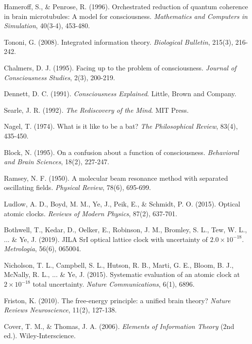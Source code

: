 \documentclass[12pt,a4paper]{article}
\begin{document}
\begin{thebibliography}{99}
Hameroff, S., \& Penrose, R. (1996). Orchestrated reduction of quantum coherence in brain microtubules: A model for consciousness. \textit{Mathematics and Computers in Simulation}, 40(3-4), 453-480.

Tononi, G. (2008). Integrated information theory. \textit{Biological Bulletin}, 215(3), 216-242.

Chalmers, D. J. (1995). Facing up to the problem of consciousness. \textit{Journal of Consciousness Studies}, 2(3), 200-219.

Dennett, D. C. (1991). \textit{Consciousness Explained}. Little, Brown and Company.

Searle, J. R. (1992). \textit{The Rediscovery of the Mind}. MIT Press.

Nagel, T. (1974). What is it like to be a bat? \textit{The Philosophical Review}, 83(4), 435-450.

Block, N. (1995). On a confusion about a function of consciousness. \textit{Behavioral and Brain Sciences}, 18(2), 227-247.

Ramsey, N. F. (1950). A molecular beam resonance method with separated oscillating fields. \textit{Physical Review}, 78(6), 695-699.

Ludlow, A. D., Boyd, M. M., Ye, J., Peik, E., \& Schmidt, P. O. (2015). Optical atomic clocks. \textit{Reviews of Modern Physics}, 87(2), 637-701.

Bothwell, T., Kedar, D., Oelker, E., Robinson, J. M., Bromley, S. L., Tew, W. L., ... \& Ye, J. (2019). JILA SrI optical lattice clock with uncertainty of $2.0 \times 10^{-18}$. \textit{Metrologia}, 56(6), 065004.

Nicholson, T. L., Campbell, S. L., Hutson, R. B., Marti, G. E., Bloom, B. J., McNally, R. L., ... \& Ye, J. (2015). Systematic evaluation of an atomic clock at $2 \times 10^{-18}$ total uncertainty. \textit{Nature Communications}, 6(1), 6896.

Friston, K. (2010). The free-energy principle: a unified brain theory? \textit{Nature Reviews Neuroscience}, 11(2), 127-138.

Cover, T. M., \& Thomas, J. A. (2006). \textit{Elements of Information Theory} (2nd ed.). Wiley-Interscience.


\end{thebibliography}
\end{document}
